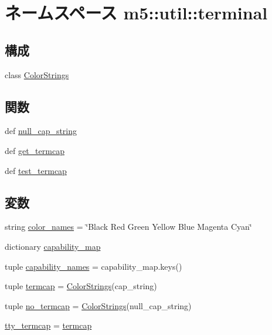 \hypertarget{namespacem5_1_1util_1_1terminal}{
\section{ネームスペース m5::util::terminal}
\label{namespacem5_1_1util_1_1terminal}
}
\subsection*{構成}
\begin{DoxyCompactItemize}
\item 
class \hyperlink{classm5_1_1util_1_1terminal_1_1ColorStrings}{ColorStrings}
\end{DoxyCompactItemize}
\subsection*{関数}
\begin{DoxyCompactItemize}
\item 
def \hyperlink{namespacem5_1_1util_1_1terminal_aedaa05021070716736cf092d2b8ad851}{null\_\-cap\_\-string}
\item 
def \hyperlink{namespacem5_1_1util_1_1terminal_ad0f951efed976bc4ff1432d7e0f22113}{get\_\-termcap}
\item 
def \hyperlink{namespacem5_1_1util_1_1terminal_aa89d63339c728f5244096532cadd9f2d}{test\_\-termcap}
\end{DoxyCompactItemize}
\subsection*{変数}
\begin{DoxyCompactItemize}
\item 
string \hyperlink{namespacem5_1_1util_1_1terminal_a1e1991c84dbf74aea9fb03d59f0c3aac}{color\_\-names} = \char`\"{}Black Red Green Yellow Blue Magenta Cyan\char`\"{}
\item 
dictionary \hyperlink{namespacem5_1_1util_1_1terminal_a8aa3d35ed0337d23f514b3a90069111b}{capability\_\-map}
\item 
tuple \hyperlink{namespacem5_1_1util_1_1terminal_a1bd00c8b9e0aed4e6587da89c189ca23}{capability\_\-names} = capability\_\-map.keys()
\item 
tuple \hyperlink{namespacem5_1_1util_1_1terminal_a90ce4115265c778ed8de590724c204bc}{termcap} = \hyperlink{classm5_1_1util_1_1terminal_1_1ColorStrings}{ColorStrings}(cap\_\-string)
\item 
tuple \hyperlink{namespacem5_1_1util_1_1terminal_a5f7ba2d76a1c07cc22052e064a5bd311}{no\_\-termcap} = \hyperlink{classm5_1_1util_1_1terminal_1_1ColorStrings}{ColorStrings}(null\_\-cap\_\-string)
\item 
\hyperlink{namespacem5_1_1util_1_1terminal_a79a1ddec9817d8860a3e74305ef33aa6}{tty\_\-termcap} = \hyperlink{namespacem5_1_1util_1_1terminal_a90ce4115265c778ed8de590724c204bc}{termcap}
\end{DoxyCompactItemize}


